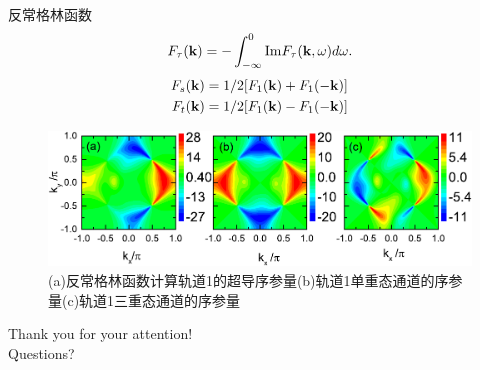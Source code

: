 \documentclass[10pt,aspectratio=169]{beamer} %
\begin{document}
\begin{frame}{反常格林函数}
\begin{equation}
F_\tau({\bf k})=-\int_{-\infty}^0\mathrm{Im}F_\tau({\bf k},\omega)d\omega.
\end{equation}
\begin{equation}
\begin{aligned}
F_s({\bf k})&=1/2[F_1({\bf k})+F_1(-{\bf k})]\\
F_t({\bf k})&=1/2[F_1({\bf k})-F_1(-{\bf k})]
\end{aligned}
\end{equation}
\begin{figure}[h]
	\centering
	\includegraphics[scale=0.6]{pic/fig22}
	\caption{(a)反常格林函数计算轨道1的超导序参量(b)轨道1单重态通道的序参量(c)轨道1三重态通道的序参量}\label{fig21}
\end{figure}
\end{frame}
\begin{frame}[plain]
	\vfill
	\centering
	{
		\centering \Huge \color{white} Thank you for your attention!\\[10pt]Questions?
	}
	\vfill
\end{frame}
\end{document}

